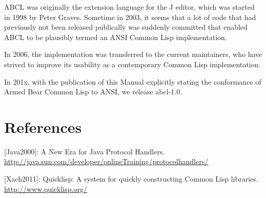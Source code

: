 \documentclass[10pt]{book}
\begin{document}
ABCL was originally the extension language for the J editor, which was
started in 1998 by Peter Graves.  Sometime in 2003, it seems that a
lot of code that had previously not been released publically was
suddenly committed that enabled ABCL to be plausibly termed an ANSI
Common Lisp implementation.

In 2006, the implementation was transferred to the current
maintainers, who have strived to improve its usability as a
contemporary Common Lisp implementation.

In 201x, with the publication of this Manual explicitly stating the
conformance of Armed Bear Common Lisp to ANSI, we release abcl-1.0.




\section{References}

[Java2000]:  A New Era for Java Protocol Handlers.
\url{http://java.sun.com/developer/onlineTraining/protocolhandlers/}

[Xach2011]:  Quicklisp:  A system for quickly constructing Common Lisp
libraries.  \url{http://www.quicklisp.org/}
\end{document}
